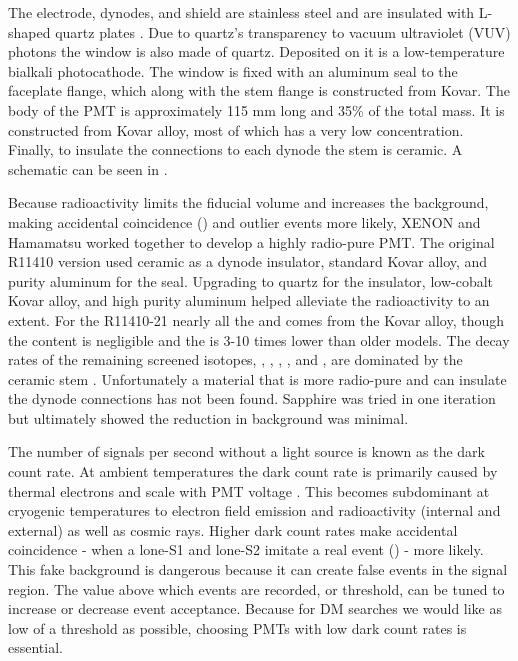 The electrode, dynodes, and shield are stainless steel and are insulated with L-shaped quartz plates .  Due to
quartz's transparency to vacuum ultraviolet (VUV) photons the window is also made of quartz.  Deposited on it is a low-temperature
bialkali
photocathode.  The window is fixed with an aluminum seal to the faceplate flange, which along with the stem flange is constructed from
Kovar.  The body of the PMT is approximately 115 mm long and 35\% of the total mass.  It is constructed from Kovar alloy, most of which
has a very low  concentration.  Finally, to insulate the connections to each dynode the stem is ceramic.  A schematic can be
seen in .  

Because radioactivity limits the fiducial volume and increases the background, making accidental coincidence
() and outlier events more
likely, XENON and Hamamatsu worked together to develop a highly radio-pure PMT.  The original R11410 version used ceramic as a dynode
insulator, standard Kovar alloy, and purity aluminum for the seal.  Upgrading to quartz for the insulator, low-cobalt Kovar alloy, and
high purity aluminum helped alleviate
the radioactivity to an extent.  For the R11410-21 nearly all the  and  comes from the Kovar alloy, though the 
content is negligible and the  is 3-10 times lower than older models.  The decay rates of the remaining screened isotopes,
,
, , , and , are dominated by the ceramic stem .  Unfortunately a
material that is more radio-pure and can insulate the dynode connections has not been found.  Sapphire was tried in one iteration but
ultimately showed the reduction in background was minimal.

The number of signals per second without a light source is known as the dark count rate.  At ambient temperatures the dark count rate
is primarily caused by thermal electrons and scale with PMT voltage .  This becomes subdominant at
cryogenic temperatures to electron field emission and radioactivity (internal and external) as well as cosmic rays.  Higher dark count
rates make accidental coincidence - when a lone-S1 and lone-S2 imitate a real event () - more likely.  This
fake background is dangerous because it can create false events in the signal region.  The value above which events are recorded, or
threshold, can be tuned to increase or decrease event acceptance.  Because
for DM searches we would like as low of a threshold as possible, choosing PMTs with low dark count rates is essential.

